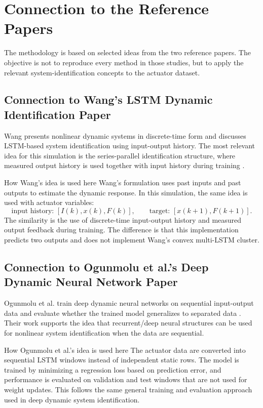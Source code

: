 \documentclass[11pt]{article}
\begin{document}
\section{Connection to the Reference Papers}
The methodology is based on selected ideas from the two reference papers. The objective is not to reproduce every method in those studies, but to apply the relevant system-identification concepts to the actuator dataset.

\subsection{Connection to Wang's LSTM Dynamic Identification Paper}
Wang presents nonlinear dynamic systems in discrete-time form and discusses LSTM-based system identification using input-output history. The most relevant idea for this simulation is the series-parallel identification structure, where measured output history is used together with input history during training \cite{wang2017}.

\begin{paperbox}{How Wang's idea is used here}
Wang's formulation uses past inputs and past outputs to estimate the dynamic response. In this simulation, the same idea is used with actuator variables:
\begin{equation}
\text{input history: }[I(k),x(k),F(k)], \qquad
\text{target: }[x(k+1),F(k+1)].
\end{equation}
The similarity is the use of discrete-time input-output history and measured output feedback during training. The difference is that this implementation predicts two outputs and does not implement Wang's convex multi-LSTM cluster.
\end{paperbox}

\subsection{Connection to Ogunmolu et al.'s Deep Dynamic Neural Network Paper}
Ogunmolu et al. train deep dynamic neural networks on sequential input-output data and evaluate whether the trained model generalizes to separated data \cite{ogunmolu2016}. Their work supports the idea that recurrent/deep neural structures can be used for nonlinear system identification when the data are sequential.

\begin{paperbox}{How Ogunmolu et al.'s idea is used here}
The actuator data are converted into sequential LSTM windows instead of independent static rows. The model is trained by minimizing a regression loss based on prediction error, and performance is evaluated on validation and test windows that are not used for weight updates. This follows the same general training and evaluation approach used in deep dynamic system identification.
\end{paperbox}
\end{document}
